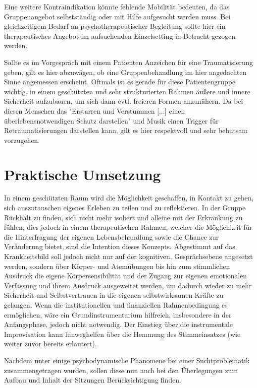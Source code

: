 Eine weitere Kontraindikation könnte fehlende Mobilität bedeuten, da das Gruppenangebot selbstständig oder mit Hilfe aufgesucht werden muss. Bei gleichzeitigem Bedarf an psychotherapeutischer Begleitung sollte hier ein therapeutisches Angebot im aufsuchenden Einzelsetting in Betracht gezogen werden.

Sollte es im Vorgespräch mit einem Patienten Anzeichen für eine Traumatisierung geben, gilt es hier abzuwägen, ob eine Gruppenbehandlung im hier angedachten Sinne angemessen erscheint. Oftmals ist es gerade für diese Patientengruppe wichtig, in einem geschützten und sehr strukturierten Rahmen äußere und innere Sicherheit aufzubauen, um sich dann evtl. freieren Formen anzunähern. Da bei diesen Menschen das "Erstarren und Verstummen [...] einen überlebensnotwendigen Schutz darstellen" \autocite[68]{rittner2012} und Musik einen Trigger für Retraumatisierungen darstellen kann, gilt es hier respektvoll und sehr behutsam vorzugehen.

\section{Praktische Umsetzung}
In einem geschützten Raum wird die Möglichkeit geschaffen, in Kontakt zu gehen, sich auszutauschen eigenes Erleben zu teilen und zu reflektieren. In der Gruppe Rückhalt zu finden, sich nicht mehr isoliert und alleine mit der Erkrankung zu fühlen, dies jedoch in einem therapeutischen Rahmen, welcher die Möglichkeit für die Hinterfragung der eigenen Lebensbehandlung sowie die Chance zur Veränderung bietet, sind die Intention dieses Konzepts. Abgestimmt auf das Krankheitsbild soll jedoch nicht nur auf der kognitiven, Gesprächsebene angesetzt werden, sondern über Körper- und Atemübungen bis hin zum stimmlichen Ausdruck die eigene Körpersensibilität und der Zugang zur eigenen emotionalen Verfassung und ihrem Ausdruck ausgeweitet werden, um dadurch wieder zu mehr Sicherheit und Selbstvertrauen in die eigenen selbstwirksamen Kräfte zu gelangen. Wenn die institutionellen und finanziellen Rahmenbedingung es ermöglichen, wäre ein Grundinstrumentarium hilfreich, insbesondere in der Anfangsphase, jedoch nicht notwendig. Der Einstieg über die instrumentale Improvisation kann hinweghelfen über die Hemmung des Stimmeinsatzes (wie weiter zuvor bereits erläutert).  

Nachdem unter \label{psychodynamische ueberlegungen} einige psychodynamische Phänomene bei einer Suchtproblematik zusammengetragen wurden, sollen diese nun auch bei den Überlegungen zum Aufbau und Inhalt der Sitzungen Berücksichtigung finden. 



